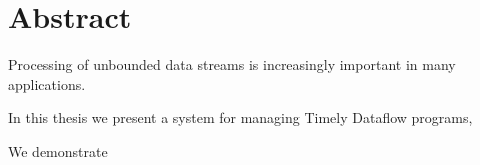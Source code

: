 \begingroup
\let\clearpage\relax
\let\cleardoublepage\relax
\let\cleardoublepage\relax

\chapter*{Abstract}

Processing of unbounded data streams is increasingly important in many
applications. 

In this thesis we present a system for managing Timely Dataflow programs,


We demonstrate 

\endgroup

